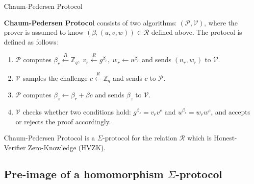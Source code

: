 \documentclass[xcolor={usenames,dvipsnames}]{beamer}
\begin{document}
    \begin{frame}{Chaum-Pedersen Protocol}
        \begin{definition}
            \textbf{Chaum-Pedersen Protocol} consists of two algorithms: $(\mathcal{P}, \mathcal{V})$, where the prover is assumed to know $(\beta,(u,v,w)) \in \mathcal{R}$ defined above. The protocol is defined as follows:
            \begin{enumerate}
                \item $\mathcal{P}$ computes $\beta_r \xleftarrow{R} \mathbb{Z}_q, \; v_r \xleftarrow{R} g^{\beta_r}, \; w_r \gets u^{\beta_r}$ and sends $(u_r,w_r)$ to $\mathcal{V}$.
                \item $\mathcal{V}$ samples the challenge $c \xleftarrow{R} \mathbb{Z}_q$ and sends $c$ to $\mathcal{P}$.
                \item $\mathcal{P}$ computes $\beta_z \gets \beta_r + \beta c$ and sends $\beta_z$ to $\mathcal{V}$.
                \item $\mathcal{V}$ checks whether two conditions hold: $g^{\beta_z} = v_rv^c$ and $u^{\beta_z} = w_r w^c$, and accepts or rejects the proof accordingly.
            \end{enumerate}
        \end{definition}
        
        \begin{theorem}
            Chaum-Pedersen Protocol is a $\Sigma$-protocol for the relation $\mathcal{R}$ which is Honest-Verifier Zero-Knowledge (HVZK).
        \end{theorem}
    \end{frame}

    \subsection{Pre-image of a homomorphism $\Sigma$-protocol}
\end{document}
